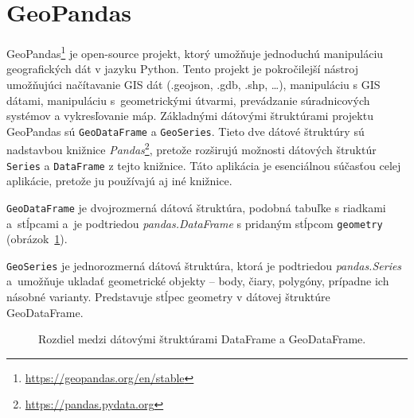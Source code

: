\section{GeoPandas}
GeoPandas\footnote{\url{https://geopandas.org/en/stable}} je open-source projekt, ktorý umožňuje jednoduchú manipuláciu geografických dát v jazyku Python. Tento projekt je pokročilejší nástroj umožňujúci načítavanie GIS dát (.geojson, .gdb, .shp, \ldots), manipuláciu s GIS dátami, manipuláciu s~geometrickými útvarmi, prevádzanie súradnicových systémov a vykresľovanie máp. Základnými dátovými štruktúrami projektu GeoPandas sú \texttt{GeoDataFrame} a \texttt{GeoSeries}. Tieto dve dátové štruktúry sú nadstavbou knižnice \emph{Pandas}\footnote{\url{https://pandas.pydata.org}}, pretože rozširujú možnosti dátových štruktúr \texttt{Series} a \texttt{DataFrame} z tejto knižnice. Táto aplikácia je esenciálnou súčasťou celej aplikácie, pretože ju používajú aj iné knižnice.

\texttt{GeoDataFrame} je dvojrozmerná dátová štruktúra, podobná tabuľke s riadkami a~stĺpcami a~je podtriedou \emph{pandas.DataFrame} s pridaným stĺpcom \texttt{geometry} (obrázok~\ref{fig:dataframes}).

\texttt{GeoSeries} je jednorozmerná dátová štruktúra, ktorá je podtriedou \emph{pandas.Series} a~umožňuje ukladať geometrické objekty \--- body, čiary, polygóny, prípadne ich násobné varianty. Predstavuje stĺpec geometry v dátovej štruktúre GeoDataFrame.

\begin{figure}[ht]
    \centering
    \qquad
    \caption{Rozdiel medzi dátovými štruktúrami DataFrame a GeoDataFrame.}
    \label{fig:dataframes}
\end{figure}


